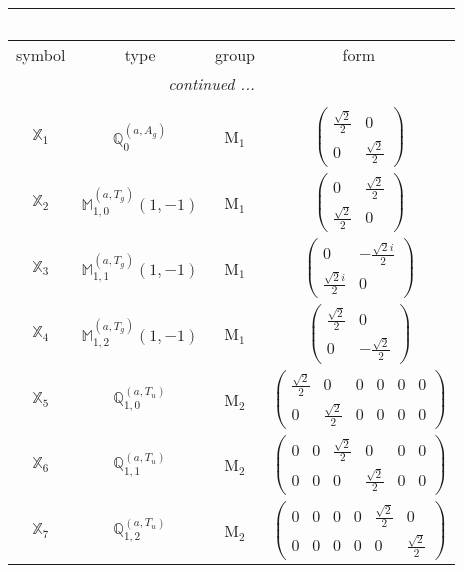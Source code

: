 \documentclass[fleqn,10pt,landscape]{article}
\begin{document}
\begin{itemize}
\begin{center}
\begin{longtable}{c|c|c|c}
\multicolumn{3}{l}{\tablename\ \thetable{}} \\
 \hline \hline
symbol & type & group & form \\ \hline \endhead

 \hline \hline
\multicolumn{3}{r}{\footnotesize\it continued ...} \\ \endfoot

 \hline \hline
\multicolumn{3}{r}{} \\ \endlastfoot

$ \mathbb{X}_{1} $ & $\mathbb{Q}_{0}^{(a,A_{g})}$ & M$_{1}$ & $\begin{pmatrix} \frac{\sqrt{2}}{2} & 0 \\ 0 & \frac{\sqrt{2}}{2} \end{pmatrix}$ \\
$ \mathbb{X}_{2} $ & $\mathbb{M}_{1,0}^{(a,T_{g})}(1,-1)$ & M$_{1}$ & $\begin{pmatrix} 0 & \frac{\sqrt{2}}{2} \\ \frac{\sqrt{2}}{2} & 0 \end{pmatrix}$ \\
$ \mathbb{X}_{3} $ & $\mathbb{M}_{1,1}^{(a,T_{g})}(1,-1)$ & M$_{1}$ & $\begin{pmatrix} 0 & - \frac{\sqrt{2} i}{2} \\ \frac{\sqrt{2} i}{2} & 0 \end{pmatrix}$ \\
$ \mathbb{X}_{4} $ & $\mathbb{M}_{1,2}^{(a,T_{g})}(1,-1)$ & M$_{1}$ & $\begin{pmatrix} \frac{\sqrt{2}}{2} & 0 \\ 0 & - \frac{\sqrt{2}}{2} \end{pmatrix}$ \\ \hline
$ \mathbb{X}_{5} $ & $\mathbb{Q}_{1,0}^{(a,T_{u})}$ & M$_{2}$ & $\begin{pmatrix} \frac{\sqrt{2}}{2} & 0 & 0 & 0 & 0 & 0 \\ 0 & \frac{\sqrt{2}}{2} & 0 & 0 & 0 & 0 \end{pmatrix}$ \\
$ \mathbb{X}_{6} $ & $\mathbb{Q}_{1,1}^{(a,T_{u})}$ & M$_{2}$ & $\begin{pmatrix} 0 & 0 & \frac{\sqrt{2}}{2} & 0 & 0 & 0 \\ 0 & 0 & 0 & \frac{\sqrt{2}}{2} & 0 & 0 \end{pmatrix}$ \\
$ \mathbb{X}_{7} $ & $\mathbb{Q}_{1,2}^{(a,T_{u})}$ & M$_{2}$ & $\begin{pmatrix} 0 & 0 & 0 & 0 & \frac{\sqrt{2}}{2} & 0 \\ 0 & 0 & 0 & 0 & 0 & \frac{\sqrt{2}}{2} \end{pmatrix}$ \\

\end{longtable}
\end{center}
\end{itemize}
\end{document}

